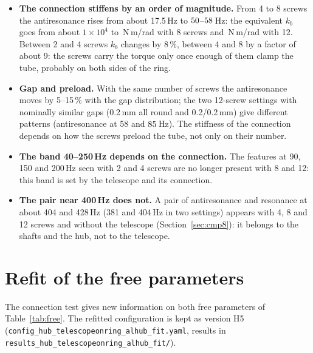 \documentclass[10pt,a4paper]{article}
\numberwithin{equation}{section}
\begin{document}
\begin{itemize}
\item \textbf{The connection stiffens by an order of magnitude.} From 4 to 8 screws the antiresonance rises from about 17.5\,Hz to $50$--$58$\,Hz: the equivalent $k_b$ goes from about $1\times10^{4}$ to \kbEightRange\,N\,m/rad with 8 screws and \kbTwelveRange\,N\,m/rad with 12. Between 2 and 4 screws $k_b$ changes by 8\,\%, between 4 and 8 by a factor of about 9: the screws carry the torque only once enough of them clamp the tube, probably on both sides of the ring.
\item \textbf{Gap and preload.} With the same number of screws the antiresonance moves by 5--15\,\% with the gap distribution; the two 12-screw settings with nominally similar gaps (0.2\,mm all round and 0.2/0.2\,mm) give different patterns (antiresonance at 58 and $85$\,Hz). The stiffness of the connection depends on how the screws preload the tube, not only on their number.
\item \textbf{The band 40--250\,Hz depends on the connection.} The features at 90, 150 and 200\,Hz seen with 2 and 4 screws are no longer present with 8 and 12: this band is set by the telescope and its connection.
\item \textbf{The pair near 400\,Hz does not.} A pair of antiresonance and resonance at about 404 and 428\,Hz (381 and 404\,Hz in two settings) appears with 4, 8 and 12 screws and without the telescope (Section~\ref{sec:cmp8}): it belongs to the shafts and the hub, not to the telescope.
\end{itemize}

\section{Refit of the free parameters}\label{sec:refit}
The connection test gives new information on both free parameters of Table~\ref{tab:free}. The refitted configuration is kept as version H5 (\texttt{config\_hub\_\allowbreak telescopeonring\_\allowbreak alhub\_\allowbreak fit.yaml}, results in \texttt{results\_hub\_\allowbreak telescopeonring\_\allowbreak alhub\_\allowbreak fit/}).
\end{document}
